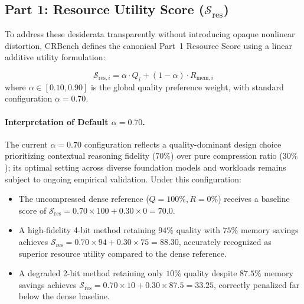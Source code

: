 \documentclass[11pt,a4paper]{article}
\begin{document}
\subsection{Part 1: Resource Utility Score ($\mathcal{S}_{\text{res}}$)}
To address these desiderata transparently without introducing opaque nonlinear distortion, CRBench defines the canonical Part~1 Resource Score using a linear additive utility formulation:

\begin{equation}
\label{eq:part1_score}
\boxed{
\mathcal{S}_{\text{res}, i} = \alpha \cdot Q_i + (1 - \alpha) \cdot R_{\text{mem}, i}
}
\end{equation}
where $\alpha \in [0.10, 0.90]$ is the global quality preference weight, with standard configuration $\alpha = 0.70$.

\paragraph{Interpretation of Default $\alpha = 0.70$.}
The current $\alpha = 0.70$ configuration reflects a quality-dominant design choice prioritizing contextual reasoning fidelity ($70\%$) over pure compression ratio ($30\%$); its optimal setting across diverse foundation models and workloads remains subject to ongoing empirical validation. Under this configuration:
\begin{itemize}[leftmargin=*]
    \item The uncompressed dense reference ($Q=100\%, R=0\%$) receives a baseline score of $\mathcal{S}_{\text{res}} = 0.70 \times 100 + 0.30 \times 0 = 70.0$.
    \item A high-fidelity 4-bit method retaining $94\%$ quality with $75\%$ memory savings achieves $\mathcal{S}_{\text{res}} = 0.70 \times 94 + 0.30 \times 75 = 88.30$, accurately recognized as superior resource utility compared to the dense reference.
    \item A degraded 2-bit method retaining only $10\%$ quality despite $87.5\%$ memory savings achieves $\mathcal{S}_{\text{res}} = 0.70 \times 10 + 0.30 \times 87.5 = 33.25$, correctly penalized far below the dense baseline.
\end{itemize}
\end{document}
